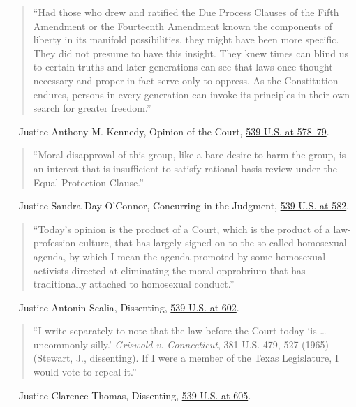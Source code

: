 \documentclass[12pt]{article}
\begin{document}
\begin{quote}
``Had those who drew and ratified the Due Process Clauses of the Fifth Amendment or the Fourteenth Amendment known the components of liberty in its manifold possibilities, they might have been more specific. They did not presume to have this insight. They knew times can blind us to certain truths and later generations can see that laws once thought necessary and proper in fact serve only to oppress. As the Constitution endures, persons in every generation can invoke its principles in their own search for greater freedom.''
\end{quote}
\noindent --- Justice Anthony M. Kennedy, Opinion of the Court, \href{https://www.law.cornell.edu/supremecourt/text/02-102}{539 U.S. at 578--79}.

\begin{quote}
``Moral disapproval of this group, like a bare desire to harm the group, is an interest that is insufficient to satisfy rational basis review under the Equal Protection Clause.''
\end{quote}
\noindent --- Justice Sandra Day O'Connor, Concurring in the Judgment, \href{https://www.law.cornell.edu/supremecourt/text/02-102}{539 U.S. at 582}.

\begin{quote}
``Today's opinion is the product of a Court, which is the product of a law-profession culture, that has largely signed on to the so-called homosexual agenda, by which I mean the agenda promoted by some homosexual activists directed at eliminating the moral opprobrium that has traditionally attached to homosexual conduct.''
\end{quote}
\noindent --- Justice Antonin Scalia, Dissenting, \href{https://www.law.cornell.edu/supremecourt/text/02-102}{539 U.S. at 602}.

\begin{quote}
``I write separately to note that the law before the Court today `is \ldots{} uncommonly silly.' \textit{Griswold v. Connecticut}, 381 U.S. 479, 527 (1965) (Stewart, J., dissenting). If I were a member of the Texas Legislature, I would vote to repeal it.''
\end{quote}
\noindent --- Justice Clarence Thomas, Dissenting, \href{https://www.law.cornell.edu/supremecourt/text/02-102}{539 U.S. at 605}.
\end{document}
